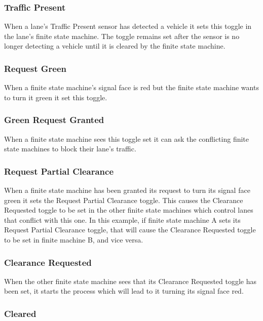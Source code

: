 \documentclass[letterpaper,twoside]{article}
\begin{document}
\subsubsection{Traffic Present}

When a lane's Traffic Present sensor has detected a vehicle
it sets this toggle in the lane's finite state machine.
The toggle remains set after the sensor is no longer
detecting a vehicle until it is cleared by the finite state machine.

\subsubsection{Request Green}

When a finite state machine's signal face is red but
the finite state machine wants to turn it green it set this toggle.

\subsubsection{Green Request Granted}

When a finite state machine sees this toggle set it can ask the conflicting
finite state machines to block their lane's traffic.

\subsubsection{Request Partial Clearance}

When a finite state machine has been granted its request to turn
its signal face green it sets
the Request Partial Clearance toggle.  This causes the Clearance Requested
toggle to be set in the other finite state machines which control lanes
that conflict with this one.  In this example, if finite state machine
A sets its Request Partial Clearance toggle, that will cause the
Clearance Requested toggle to be set in finite machine B, and vice versa.

\subsubsection{Clearance Requested}

When the other finite state machine sees that its Clearance Requested
toggle has been set, it starts the process which will lead to
it turning its signal face red.

\subsubsection{Cleared}
\end{document}
